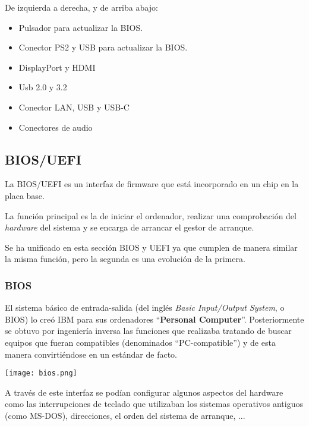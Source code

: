 De izquierda a derecha, y de arriba abajo:
\begin{itemize}
    \item Pulsador para actualizar la BIOS.
    \item Conector PS2 y USB para actualizar la BIOS.
    \item DisplayPort y HDMI
    \item Usb 2.0 y 3.2
    \item Conector LAN, USB y USB-C
    \item Conectores de audio
\end{itemize}


\subsection{BIOS/UEFI}
La BIOS/UEFI es un interfaz de firmware que está incorporado en un chip en la placa base.

La función principal es la de iniciar el ordenador, realizar una comprobación del \textit{hardware} del sistema  y se encarga de arrancar el gestor de arranque.

Se ha unificado en esta sección BIOS y UEFI ya que cumplen de manera similar la misma función, pero la segunda es una evolución de la primera.

\subsubsection{BIOS}

El sistema básico de entrada-salida (del inglés \textit{Basic Input/Output System}, o BIOS) lo creó IBM para sus ordenadores “\textbf{Personal Computer}”. Posteriormente se obtuvo por ingeniería inversa las funciones que realizaba tratando de buscar equipos  que fueran compatibles (denominados “PC-compatible”) y de esta manera convirtiéndose en un estándar de facto.

\begin{center}
    \texttt{[image: bios.png]}
\end{center}

A través de este interfaz se podían configurar algunos aspectos del hardware como las interrupciones de teclado que utilizaban los sistemas operativos antiguos (como MS-DOS), direcciones, el orden del sistema de arranque, ...


\hypertarget{UFI}{}
